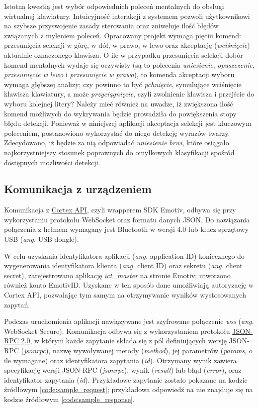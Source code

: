 \documentclass[skorowidz,skroty]{dyplomWEZUT}
\begin{document}
Istotną kwestią jest wybór odpowiednich poleceń mentalnych do obsługi wirtualnej klawiatury. Intuicyjność interakcji z systemem pozwoli użytkownikowi na szybsze przyswojenie zasady sterowania oraz zniweluje ilość błędów związanych z myleniem poleceń. Opracowany projekt wymaga pięciu komend: przesunięcia selekcji w górę, w dół, w prawo, w lewo oraz akceptację (\textit{wciśnięcie}) aktualnie oznaczonego klawisza. O ile w przypadku przesunięcia selekcji dobór komend mentalnych wydaje się oczywisty (są to polecenia \textit{uniesienie}, \textit{opuszczenie}, \textit{przesunięcie w lewo} i \textit{przesunięcie w prawo}), to komenda akceptacji wyboru wymaga głębszej analizy; czy powinno to być \textit{pchnięcie}, symulujące wciśnięcie klawisza klawiatury, a może \textit{przyciągnięcie}, czyli zwolnienie klawisza i przejście do wyboru kolejnej litery? Należy mieć również na uwadze, iż zwiększona ilość komend możliwych do wykrywania będzie prowadziła do powiększenia stopy błędu detekcji. Ponieważ w niniejszej aplikacji akceptacja selekcji jest kluczowym poleceniem, postanowiono wykorzystać do niego detekcję wyrazów twarzy. Zdecydowano, iż będzie za nią odpowiadać \textit{uniesienie brwi}, które osiągało najkorzystniejszy stosunek poprawnych do omyłkowych klasyfikacji spośród dostępnych możliwości detekcji. 


\subsection{Komunikacja z urządzeniem}
Komunikacja z \href{https://emotiv.gitbook.io/cortex-api/}{Cortex API}, czyli wrapperem SDK Emotiv, odbywa się przy wykorzystaniu protokołu WebSocket oraz formatu danych JSON. Do nawiązania połączenia z hełmem wymagany jest Bluetooth w wersji 4.0 lub klucz sprzętowy USB (\textit{ang.} USB dongle).

W celu uzyskania identyfikatora aplikacji (\textit{ang.} application ID) koniecznego do wygenerowania identyfikatora klienta (\textit{ang.} client ID) oraz sekretu (\textit{ang.} client secret), zarejestrowano aplikację \textit{ict\_master} na stronie Emotiv; utworzono również konto EmotivID. Uzyskane w ten sposób dane umożliwiają autoryzację w Cortex API, pozwalając tym samym na otrzymywanie wyników wystosowanych zapytań.

Podczas uruchomienia aplikacji nawiązywane jest szyfrowane połączenie \textit{wss} (\textit{ang.} WebSocket Secure). Komunikacja odbywa się z wykorzystaniem protokołu \href{https://www.jsonrpc.org/specification}{JSON-RPC 2.0}, w którym każde zapytanie składa się z pól definiujących wersję JSON-RPC (\textit{jsonrpc}), nazwę wywoływanej metody (\textit{method}), jej parametrów (\textit{params}, o ile wymagane) oraz identyfikatora zapytania (\textit{id}). Otrzymany wynik zawiera specyfikację wersji JSON-RPC (\textit{jsonrpc}), wynik (\textit{result}) lub błąd (\textit{error}), oraz identyfikator zapytania (\textit{id}). Przykładowe zapytanie zostało pokazane na kodzie źródłowym \ref{code:sample_request}; przykładowa odpowiedź na nie znajduje się na kodzie źródłowym \ref{code:sample_response}.
\end{document}
